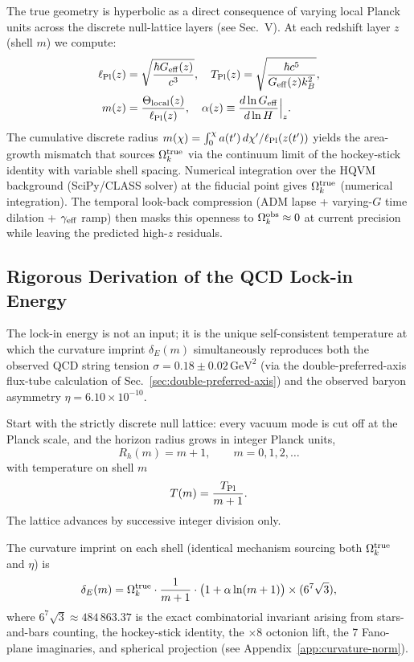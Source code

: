 \documentclass[12pt,a4paper]{article}
\begin{document}
The true geometry is hyperbolic as a direct consequence of varying local Planck units across the discrete null-lattice layers (see Sec.~V). At each redshift layer $z$ (shell $m$) we compute:
\begin{align*}
\ell_{\rm Pl}(z) &= \sqrt{\frac{\hbar G_{\rm eff}(z)}{c^3}}, \quad
T_{\rm Pl}(z) = \sqrt{\frac{\hbar c^5}{G_{\rm eff}(z) k_B^2}}, \\
m(z) &= \frac{\Theta_{\rm local}(z)}{\ell_{\rm Pl}(z)}, \quad
\alpha(z) \equiv \frac{d\ln G_{\rm eff}}{d\ln H}\Big|_z.
\end{align*}
The cumulative discrete radius $m(\chi)=\int_0^\chi a(t')\,d\chi'/\ell_{\rm Pl}(z(t'))$ yields the area-growth mismatch that sources $\Omega_k^{\rm true}$ via the continuum limit of the hockey-stick identity with variable shell spacing. Numerical integration over the HQVM background (SciPy/CLASS solver) at the fiducial point gives \(\Omega_k^{\rm true}\) (numerical integration). The temporal look-back compression (ADM lapse + varying-$G$ time dilation + $\gamma_{\rm eff}$ ramp) then masks this openness to $\Omega_k^{\rm obs}\approx0$ at current precision while leaving the predicted high-$z$ residuals.

\subsection{Rigorous Derivation of the QCD Lock-in Energy}
The lock-in energy is not an input; it is the unique self-consistent temperature at which the curvature imprint \(\delta_E(m)\) simultaneously reproduces both the observed QCD string tension \(\sigma = 0.18 \pm 0.02\,\text{GeV}^2\) (via the double-preferred-axis flux-tube calculation of Sec.~\ref{sec:double-preferred-axis}) and the observed baryon asymmetry \(\eta = 6.10 \times 10^{-10}\).

Start with the strictly discrete null lattice: every vacuum mode is cut off at the Planck scale, and the horizon radius grows in integer Planck units,
\[
R_h(m) = m + 1, \qquad m = 0,1,2,\dots
\]
with temperature on shell \(m\)
\[
T(m) = \frac{T_{\rm Pl}}{m+1}.
\]
The lattice advances by successive integer division only.

The curvature imprint on each shell (identical mechanism sourcing both \(\Omega_k^{\rm true}\) and \(\eta\)) is
\[
\delta_E(m) = \Omega_k^{\rm true} \cdot \frac{1}{m+1} \cdot \bigl(1 + \alpha \ln(m+1)\bigr) \times (6^7\sqrt{3}),
\]
where \(6^7\sqrt{3} \approx 484\,863.37\) is the exact combinatorial invariant arising from stars-and-bars counting, the hockey-stick identity, the \(\times 8\) octonion lift, the 7 Fano-plane imaginaries, and spherical projection (see Appendix~\ref{app:curvature-norm}).
\end{document}
